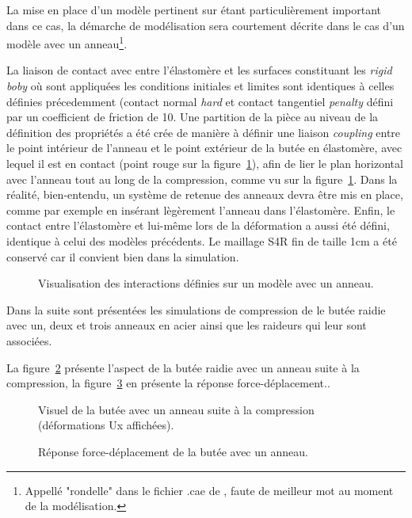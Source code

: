 ﻿\documentclass{article}
\newcommand{\abaqus}{\bsc{Abaqus}\xspace}
\begin{document}
La mise en place d'un modèle pertinent sur \abaqus étant particulièrement important dans ce cas, la démarche de modélisation sera courtement décrite dans le cas d'un modèle avec un anneau\footnote{Appellé "rondelle" dans le fichier .cae de \Abaqus, faute de meilleur mot au moment de la modélisation.}.

La liaison de contact avec entre l'élastomère et les surfaces constituant les \textit{rigid boby} où sont appliquées les conditions initiales et limites sont identiques à celles définies précedemment (contact normal \textit{hard} et contact tangentiel \textit{penalty} défini par un coefficient de friction de 10. Une partition de la pièce au niveau de la définition des propriétés a été crée de manière à définir une liaison \textit{coupling} entre le point intérieur de l'anneau et le point extérieur de la butée en élastomère, avec lequel il est en contact (point rouge sur la figure~\ref{fig28}), afin de lier le plan horizontal avec l'anneau tout au long de la compression, comme vu sur la figure~\ref{fig28}. Dans la réalité, bien-entendu, un système de retenue des anneaux devra être mis en place, comme par exemple en insérant lègèrement l'anneau dans l'élastomère. Enfin, le contact entre l'élastomère et lui-même lors de la déformation a aussi été défini, identique à celui des modèles précédents. Le maillage S4R fin de taille 1cm a été conservé car il convient bien dans la simulation.

\begin{figure}[!h]
	\centering
	\caption{Visualisation des interactions définies sur un modèle avec un anneau.}
	\label{fig28}
\end{figure}

Dans la suite sont présentées les simulations de compression de le butée raidie avec un, deux et trois anneaux en acier ainsi que les raideurs qui leur sont associées.

La figure~\ref{fig29} présente l'aspect de la butée raidie avec un anneau suite à la compression, la figure~\ref{fig30} en présente la réponse force-déplacement..

\begin{figure}[!h]
	\centering
	\caption{Visuel de la butée avec un anneau suite à la compression (déformations Ux affichées).}
	\label{fig29}
\end{figure}

\begin{figure}[!h]
	\centering
	\caption{Réponse force-déplacement de la butée avec un anneau.}
	\label{fig30}
\end{figure}
\end{document}
